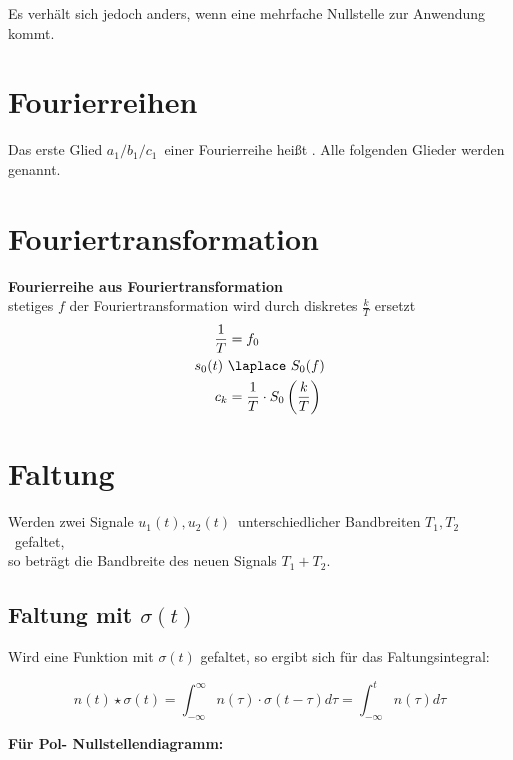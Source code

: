 \documentclass[12pt, a4paper]{scrartcl}
\begin{document}
Es verhält sich jedoch anders, wenn eine mehrfache Nullstelle zur Anwendung kommt.

\section{Fourierreihen}

\begin{tcolorbox}
  Das erste Glied \(a_1 / b_1 / c_1\)~einer Fourierreihe heißt . Alle folgenden Glieder werden  genannt.
\end{tcolorbox}


\section{Fouriertransformation}

\textbf{Fourierreihe aus Fouriertransformation}\\
 stetiges \(f\) der Fouriertransformation wird durch diskretes \(\frac{k}{T}\) ersetzt
\begin{align*}
  \frac{1}{T} &= f_0\\
  s_0(t)\ &\laplace\ S_0(f)\\
  c_k &= \frac{1}{T} \cdot S_0\left(\frac{k}{T}\right)
\end{align*}

\section{Faltung}

\begin{tcolorbox}
  Werden zwei Signale \(u_1(t), u_2(t)\)~unterschiedlicher Bandbreiten \(T_1, T_2\)~gefaltet,\\
  so beträgt die Bandbreite des neuen Signals \(T_1 + T_2\).
\end{tcolorbox}

\subsection{Faltung mit \(\sigma (t)\)}

Wird eine Funktion mit \(\sigma (t)\) gefaltet, so ergibt sich für das Faltungsintegral:

\[
  n(t) \star \sigma (t) = \int_{-\infty}^{\infty} n(\tau) \cdot \sigma(t - \tau) d\tau = \int_{-\infty}^t n(\tau) d\tau
\]

\textbf{Für Pol- Nullstellendiagramm:}
\end{document}
